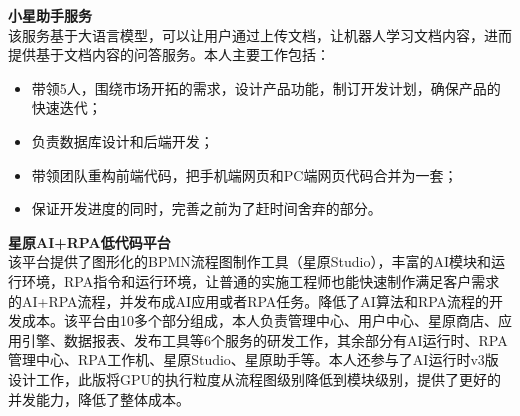 \documentclass[a4paper]{article}
\newenvironment{changemargin}[2]{%
  \begin{list}{}{%
    \setlength{\topsep}{0pt}%
    \setlength{\leftmargin}{#1}%
    \setlength{\rightmargin}{#2}%
    \setlength{\listparindent}{\parindent}%
    \setlength{\itemindent}{\parindent}%
    \setlength{\parsep}{\parskip}%
  }%
  \item[]}{\end{list}
}
\newenvironment{body} {
	\vspace*{-16pt}
	\begin{changemargin}{-0.5in}{-0.5in}
  }	
	{\end{changemargin}
}
\begin{document}
\begin{body}
	\vspace{14pt}
  	\textbf{小星助手服务} \\
  	\smallskip
 	该服务基于大语言模型，可以让用户通过上传文档，让机器人学习文档内容，进而提供基于文档内容的问答服务。本人主要工作包括：
	\vspace*{-2pt}
	\begin{itemize} \itemsep -0pt  %
		\item 带领5人，围绕市场开拓的需求，设计产品功能，制订开发计划，确保产品的快速迭代；\\
	\end{itemize}
	\vspace*{-10pt}
	\begin{itemize} \itemsep -0pt  %
		\item 负责数据库设计和后端开发；\\
	\end{itemize}
	\vspace*{-10pt}
	\begin{itemize} \itemsep -0pt  %
		\item 带领团队重构前端代码，把手机端网页和PC端网页代码合并为一套；\\
	\end{itemize}
	\vspace*{-10pt}
	\begin{itemize} \itemsep -0pt  %
		\item 保证开发进度的同时，完善之前为了赶时间舍弃的部分。\\
	\end{itemize}
	
	\vspace{14pt}
  	\textbf{星原AI+RPA低代码平台} \\
  	\smallskip
 	该平台提供了图形化的BPMN流程图制作工具（星原Studio），丰富的AI模块和运行环境，RPA指令和运行环境，让普通的实施工程师也能快速制作满足客户需求的AI+RPA流程，并发布成AI应用或者RPA任务。降低了AI算法和RPA流程的开发成本。该平台由10多个部分组成，本人负责管理中心、用户中心、星原商店、应用引擎、数据报表、发布工具等6个服务的研发工作，其余部分有AI运行时、RPA管理中心、RPA工作机、星原Studio、星原助手等。本人还参与了AI运行时v3版设计工作，此版将GPU的执行粒度从流程图级别降低到模块级别，提供了更好的并发能力，降低了整体成本。\\
	

\end{body}
\end{document}
